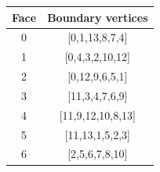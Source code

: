 \begin{center}\small
\begin{tabular}{c|c}
\toprule
Face & Boundary vertices\\
\midrule
0 & [0,1,13,8,7,4]\\
1 & [0,4,3,2,10,12]\\
2 & [0,12,9,6,5,1]\\
3 & [11,3,4,7,6,9]\\
4 & [11,9,12,10,8,13]\\
5 & [11,13,1,5,2,3]\\
6 & [2,5,6,7,8,10]\\
\bottomrule
\end{tabular}
\end{center}
